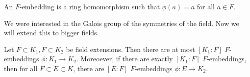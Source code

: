   \begin{definition}
    An $F$-embedding is a ring homomorphism such that $\phi(a) = a$ for all $a \in F$. 
  \end{definition}

  \begin{definition}
    
  \end{definition}

  We were interested in the Galois group of the symmetries of the field. Now we will extend this to bigger fields. 

  \begin{theorem}[Shifrin 7.6, 6.4]
    Let $F \subset K_1, F \subset K_2$ be field extensions. Then there are at most $[K_1:F]$ $F$-embeddings $\phi: K_1 \to K_2$. Moreoever, if there are exactly $[K_1:F]$ $F$-embeddings, then for all $F \subset E \subset K$, there are $[E:F]$ $F$-embeddings $\phi: E \to K_2$. 
  \end{theorem}
